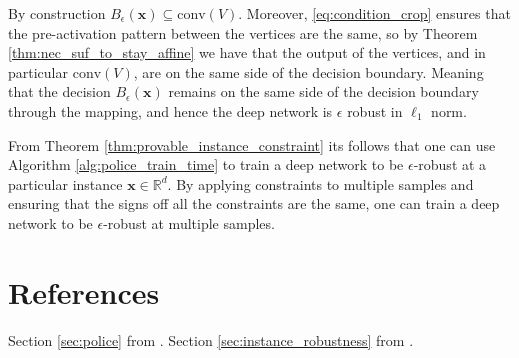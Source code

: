 \begin{tproof}
    By construction $B_{\epsilon}(\mathbf{x})\subseteq\mathrm{conv}(V)$. Moreover, \eqref{eq:condition_crop} ensures that the pre-activation pattern between the vertices are the same, so by Theorem \ref{thm:nec_suf_to_stay_affine} we have that the output of the vertices, and in particular $\mathrm{conv}(V)$, are on the same side of the decision boundary. Meaning that the decision $B_{\epsilon}(\mathbf{x})$ remains on the same side of the decision boundary through the mapping, and hence the deep network is $\epsilon$ robust in $\ell_1$ norm.
\end{tproof}

From Theorem \ref{thm:provable_instance_constraint} its follows that one can use Algorithm \ref{alg:police_train_time} to train a deep network to be $\epsilon$-robust at a particular instance $\mathbf{x}\in\mathbb{R}^d$. By applying constraints to multiple samples and ensuring that the signs off all the constraints are the same, one can train a deep network to be $\epsilon$-robust at multiple samples.

\section{References}

Section \ref{sec:police} from \cite{balestrieroPoliceProvablyOptimal2023}. Section \ref{sec:instance_robustness} from \cite{humayunProvableInstanceSpecific2023}.